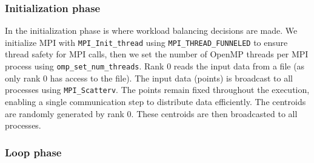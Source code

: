 \documentclass[11pt, journal]{IEEEtran}
\begin{document}
\subsubsection{Initialization phase}

In the initialization phase is where workload balancing decisions are made. We initialize MPI with \verb|MPI_Init_thread| using \verb|MPI_THREAD_FUNNELED| to ensure thread safety for MPI calls, then we set the number of OpenMP threads per MPI process using \verb|omp_set_num_threads|. Rank 0 reads the input data from a file (as only rank 0 has access to the file). The input data (points) is broadcast to all processes using \verb|MPI_Scatterv|. The points remain fixed throughout the execution, enabling a single communication step to distribute data efficiently. The centroids are randomly generated by rank 0. These centroids are then broadcasted to all processes.

\subsubsection{Loop phase}
\end{document}
